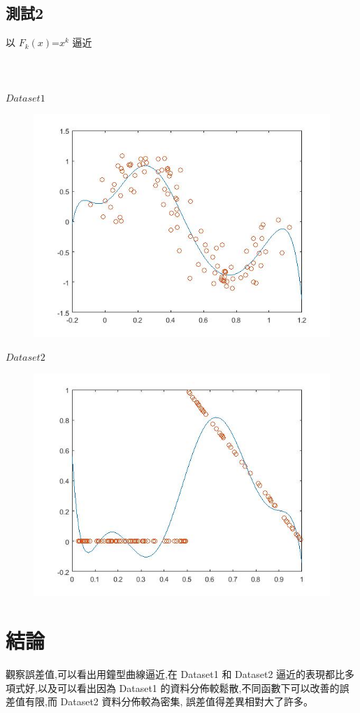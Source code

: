 \documentclass[a4paper,margin=1in]{article}
\begin{document}
\newpage

\subsection{測試2}
以 $F_{k}(x)$=$x^k$ 逼近\\ \\ \\ \\ 
$Dataset1$
\begin{figure}[!htbp]
	\centering
	\includegraphics[width=\linewidth]{Figure21.jpg}
\end{figure}
\newpage
$Dataset2$
\begin{figure}[!htbp]
	\centering
	\includegraphics[width=\linewidth]{Figure22.jpg}
\end{figure}
\newpage
\section{結論}

觀察誤差值,可以看出用鐘型曲線逼近,在 Dataset1 和 Dataset2 逼近的表現都比多項式好,以及可以看出因為 Dataset1 的資料分佈較鬆散,不同函數下可以改善的誤差值有限,而 Dataset2 資料分佈較為密集, 誤差值得差異相對大了許多。
\end{document}

